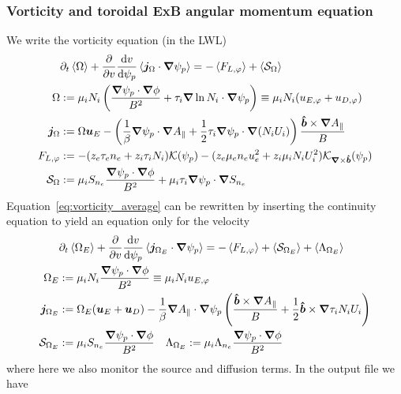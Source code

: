\subsubsection{Vorticity and toroidal ExB angular momentum equation} \label{sec:vorticity_eq}
We write the vorticity equation (in the LWL)
\begin{align}
    &\partial_t \left \langle \Omega \right \rangle + \frac{\partial}{\partial v}\frac{\mathrm{d} v}{\mathrm{d}\psi_p}\left \langle {\boldsymbol{j}}_\Omega\cdot{\boldsymbol{\nabla}}\psi_p \right \rangle = -\left \langle F_{L,\varphi} \right \rangle + \left \langle \mathcal S_\Omega \right \rangle \label{eq:vorticity_average} \\
\Omega &:= \mu_i N_i \left(\frac{{\boldsymbol{\nabla}}\psi_p\cdot{\boldsymbol{\nabla}}\phi}{B^2} + \tau_i {\boldsymbol{\nabla}}\ln N_i\cdot{\boldsymbol{\nabla}}\psi_p\right) \equiv \mu_i N_i(u_{E,\varphi} + u_{D,\varphi}) \\
{\boldsymbol{j}}_{\Omega} &:= \Omega {\boldsymbol{u}}_E
    - \left(\frac{1}{\beta} {\boldsymbol{\nabla}}\psi_p \cdot{\boldsymbol{\nabla}} A_\parallel +\frac{1}{2}\tau_i {\boldsymbol{\nabla}}\psi_p\cdot{\boldsymbol{\nabla}}  (N_iU_i)\right)\frac{\bm{\hat{b}}\times{\boldsymbol{\nabla}} A_\parallel}{B} \\
    F_{L,\varphi} &:=  -(z_e \tau_e n_e + z_i\tau_i N_i)\mathcal K(\psi_p) - (z_e\mu_e n_eu_e^2 + z_i\mu_i N_iU_i^2)\mathcal K_{{\boldsymbol{\nabla}}\times\bm{\hat{b}}}(\psi_p) \\
    \mathcal S_\Omega &:= \mu_i S_{n_e} \frac{{\boldsymbol{\nabla}}\psi_p\cdot{\boldsymbol{\nabla}} \phi}{B^2} + \mu_i\tau_i{\boldsymbol{\nabla}}\psi_p\cdot{\boldsymbol{\nabla}} S_{n_e} \label{eq:em_source}
\end{align}
Equation~\eqref{eq:vorticity_average} can be rewritten by inserting the continuity equation to yield an equation only for the \ExB velocity
\begin{align}
&\partial_t \left \langle \Omega_E \right \rangle + \frac{\partial}{\partial v} \frac{\mathrm{d} v}{\mathrm{d} \psi_p}\left \langle  {\boldsymbol{j}}_{\Omega_E}\cdot{\boldsymbol{\nabla}}\psi_p \right \rangle = -\left \langle F_{L,\varphi} \right \rangle+ \left \langle \mathcal S_{\Omega_E} \right \rangle + \left \langle \Lambda_{\Omega_E} \right \rangle \label{eq:exb_average} \\
\Omega_E &:= \mu_i N_i \frac{{\boldsymbol{\nabla}}\psi_p\cdot{\boldsymbol{\nabla}}\phi}{B^2} \equiv \mu_i N_i u_{E,\varphi} \\
{\boldsymbol{j}}_{\Omega_E} &:= \Omega_E ({\boldsymbol{u}}_E + {\boldsymbol{u}}_D)
    - \frac{1}{\beta} {\boldsymbol{\nabla}} A_\parallel\cdot{\boldsymbol{\nabla}}\psi_p \left(\frac{\bm{\hat{b}}\times{\boldsymbol{\nabla}} A_\parallel}{B} +\frac{1}{2} \bm{\hat{b}} \times {\boldsymbol{\nabla}} \tau_i N_iU_i\right) \\
    \mathcal S_{\Omega_E} &:= \mu_i S_{n_e} \frac{{\boldsymbol{\nabla}}\psi_p\cdot{\boldsymbol{\nabla}}\phi}{B^2} \quad
    \Lambda_{\Omega_E} := \mu_i \Lambda_{n_e}\frac{{\boldsymbol{\nabla}}\psi_p\cdot{\boldsymbol{\nabla}}\phi}{B^2}
\end{align}
where here we also monitor the source and diffusion terms.
In the output file we have
